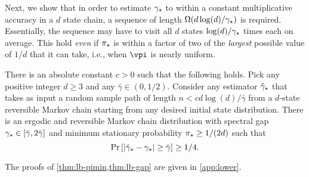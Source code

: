 Next, we show that in order to estimate
$\gamma_{\star}$ to within a constant multiplicative accuracy in a $d$ state chain,
a sequence of length $\Omega(d\log(d)/\gamma_{\star})$ is required.
Essentially, the sequence may have to visit all $d$ states $\log(d)/\gamma_{\star}$ times each on average.
This hold \emph{even} if $\pi_{\star}$ is within a factor of two of the
\emph{largest} possible value of $1/d$ that it can take, i.e., when
$\vpi$ is nearly uniform.
\begin{theorem}
  \label{thm:lb-gap}
  There is an absolute constant $c>0$ such that the following holds.
  Pick any positive integer $d \geq 3$ and any $\bar\gamma \in
  (0,1/2)$.
  Consider any estimator $\hat\gamma_{\star}$ that takes as input a random sample
  path of length $n < c d\log(d) / \bar\gamma$ from a $d$-state
  reversible Markov chain starting from any desired initial state
  distribution.
  There is an ergodic and reversible Markov chain distribution
  with spectral gap $\gamma_{\star} \in [\bar\gamma,2\bar\gamma]$ and minimum
  stationary probability $\pi_{\star} \geq 1/(2d)$ such that
  \[
    \Pr\left[ |\hat\gamma_{\star} - \gamma_{\star}| \geq \bar\gamma\right] \geq 1/4 .
  \]
\end{theorem}

The proofs of \cref{thm:lb-pimin,thm:lb-gap} are given in
\cref{app:lower}.

